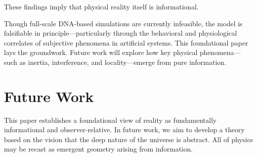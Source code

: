 \documentclass[11pt]{article}
\begin{document}
These findings imply that physical reality itself is informational.

Though full-scale DNA-based simulations are currently infeasible, the model is falsifiable in principle—particularly through the behavioral and physiological correlates of subjective phenomena in artificial systems. This foundational paper lays the groundwork. Future work will explore how key physical phenomena—such as inertia, interference, and locality—emerge from pure information.

\section*{Future Work}

This paper establishes a foundational view of reality as fundamentally informational and observer-relative. In future work, we aim to develop a theory based on the vision that the deep nature of the universe is abstract. All of physics may be recast as emergent geometry arising from information.
\end{document}
